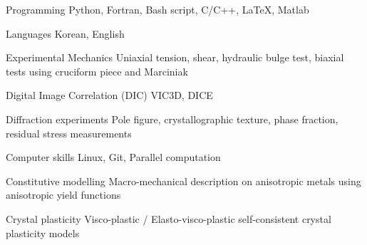 

\begin{cvskills}
  \cvskill
  {Programming}
  {Python, Fortran, Bash script, C/C++, LaTeX, Matlab}

  \cvskill
  {Languages}
  {Korean, English}

  \cvskill
  {Experimental Mechanics}
  {Uniaxial tension, shear, hydraulic bulge test, biaxial tests using cruciform piece and Marciniak}

  \cvskill
  {Digital Image Correlation (DIC)}
  {VIC3D, DICE}

  \cvskill
  {Diffraction experiments}
  {Pole figure, crystallographic texture, phase fraction, residual stress measurements}

  \cvskill
  {Computer skills}
  {Linux, Git, Parallel computation}

  \cvskill
  {Constitutive modelling}
  {Macro-mechanical description on anisotropic metals using anisotropic yield functions}

  \cvskill
  {Crystal plasticity}
  {Visco-plastic / Elasto-visco-plastic self-consistent crystal plasticity models}


\end{cvskills}